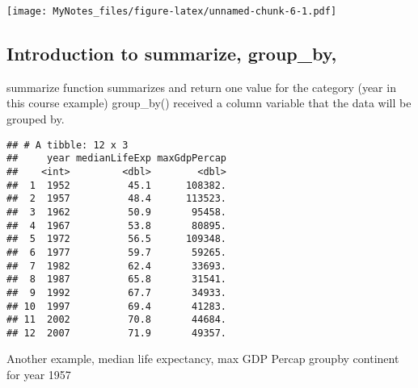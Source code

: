 \documentclass[]{article}
\newenvironment{Shaded}{\begin{snugshade}}{\end{snugshade}}
\newcommand{\KeywordTok}[1]{\textcolor[rgb]{0.13,0.29,0.53}{\textbf{#1}}}
\newcommand{\DataTypeTok}[1]{\textcolor[rgb]{0.13,0.29,0.53}{#1}}
\newcommand{\DecValTok}[1]{\textcolor[rgb]{0.00,0.00,0.81}{#1}}
\newcommand{\StringTok}[1]{\textcolor[rgb]{0.31,0.60,0.02}{#1}}
\newcommand{\CommentTok}[1]{\textcolor[rgb]{0.56,0.35,0.01}{\textit{#1}}}
\newcommand{\OperatorTok}[1]{\textcolor[rgb]{0.81,0.36,0.00}{\textbf{#1}}}
\newcommand{\NormalTok}[1]{#1}
\begin{document}
\texttt{[image: MyNotes\_files/figure-latex/unnamed-chunk-6-1.pdf]}

\subsection{Introduction to summarize,
group\_by,}\label{introduction-to-summarize-group_by}

summarize function summarizes and return one value for the category
(year in this course example) group\_by() received a column variable
that the data will be grouped by.

\begin{Shaded}
\end{Shaded}

\begin{verbatim}
## # A tibble: 12 x 3
##     year medianLifeExp maxGdpPercap
##    <int>         <dbl>        <dbl>
##  1  1952          45.1      108382.
##  2  1957          48.4      113523.
##  3  1962          50.9       95458.
##  4  1967          53.8       80895.
##  5  1972          56.5      109348.
##  6  1977          59.7       59265.
##  7  1982          62.4       33693.
##  8  1987          65.8       31541.
##  9  1992          67.7       34933.
## 10  1997          69.4       41283.
## 11  2002          70.8       44684.
## 12  2007          71.9       49357.
\end{verbatim}

Another example, median life expectancy, max GDP Percap groupby
continent for year 1957

\begin{Shaded}
\end{Shaded}
\end{document}
